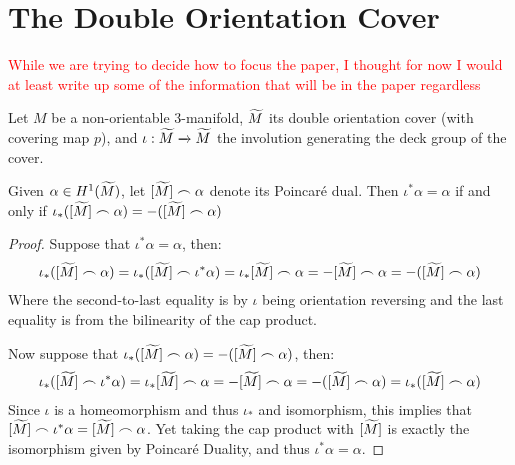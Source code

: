 \section{The Double Orientation Cover}

\textcolor{red}{While we are trying to decide how to focus the paper, I thought for now I would at least write up some of the information that will be in the paper regardless}

Let $M$ be a non-orientable 3-manifold, $\widetilde{M}$ its double orientation cover (with covering map $p$), and $\iota: \widetilde{M} \xrightarrow[]{} \widetilde{M}$ the involution generating the deck group of the cover.

\begin{lem}
Given $\alpha \in H^1(\widetilde{M})$, let $[\widetilde{M}] \frown \alpha$ denote its Poincar\'e dual. Then $\iota^*\alpha = \alpha$ if and only if $\iota_*([\widetilde{M}] \frown \alpha) = -([\widetilde{M}] \frown \alpha)$ 
\end{lem}
\begin{proof}
Suppose that $\iota^*\alpha = \alpha$, then:
\begin{align*}
    \iota_*([\widetilde{M}] \frown \alpha) = \iota_*([\widetilde{M}] \frown \iota^*\alpha) = \iota_*[\widetilde{M}] \frown \alpha = -[\widetilde{M}] \frown \alpha = -([\widetilde{M}] \frown \alpha)
\end{align*}
Where the second-to-last equality is by $\iota$ being orientation reversing and the last equality is from the bilinearity of the cap product.

Now suppose that $\iota_*([\widetilde{M}] \frown \alpha) = -([\widetilde{M}] \frown \alpha)$, then:
\begin{align*}
    \iota_*([\widetilde{M}] \frown \iota^*\alpha) = \iota_*[\widetilde{M}] \frown \alpha = -[\widetilde{M}] \frown \alpha = -([\widetilde{M}] \frown \alpha) = \iota_*([\widetilde{M}] \frown \alpha)
\end{align*}
Since $\iota$ is a homeomorphism and thus $\iota_*$ and isomorphism, this implies that $[\widetilde{M}] \frown \iota^*\alpha = [\widetilde{M}] \frown \alpha$. Yet taking the cap product with $[\widetilde{M}]$ is exactly the isomorphism given by Poincar\'e Duality, and thus $\iota^*\alpha = \alpha$.
\end{proof}


